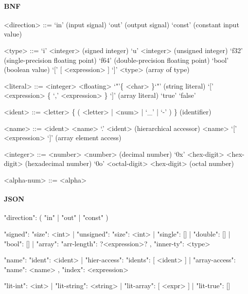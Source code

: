 \documentclass{article}
\begin{document}
\paragraph{BNF}
\begin{grammar}

  <direction> ::= `in' (input signal)
  \alt `out' (output signal)
  \alt `const' (constant input value)

  <type> ::= `i' <integer> (signed integer)
  \alt `u' <integer> (unsigned integer)
  \alt `f32' (single-precision floating point)
  \alt `f64' (double-precision floating point)
  \alt `bool' (boolean value)
  \alt `[' [ <expression> ] `]' <type> (array of type)


  <literal> ::= <integer>
  \alt <floating>
  \alt `"'\{ <char> \}`"' (string literal)
  \alt `[' <expression> \{ `,' <expression> \} `]' (array literal)
  \alt `true'
  \alt `false'

  <ident> ::= <letter> \{ ( <letter> | <num> | `_' | `-' ) \} (identifier)

  <name> ::= <ident>
  \alt <name> `.' <ident> (hierarchical accessor)
  \alt <name> `[' <expression> `]' (array element access)

  <integer> ::= <number> { <number> } (decimal number)
  \alt `0x' <hex-digit> { <hex-digit> } (hexadecimal number)
  \alt `0o' <octal-digit> { <hex-digit> } (octal number)

  <alpha-num> ::= <alpha>

\end{grammar}

\paragraph{JSON}
\begin{jsoncode}
{"direction": ( "in"
              | "out"
              | "const" )
}

{ "signed": { "size": <int> }
| "unsigned": { "size": <int> }
| "single": []
| "double": []
| "bool": []
| "array": { "arr-length": ?<expression>?
           , "inner-ty": <type>
           }
}

{ "name": { "ident": <ident> }
| "hier-access": { "idents": [ <ident> ] }
| "array-access": { "name": <name>
                  , "index": <expression>
                  }
}

{ "lit-int": <int>
| "lit-string": <string>
| "lit-array": [ <expr> ]
| "lit-true": []
}
\end{jsoncode}
\end{document}
